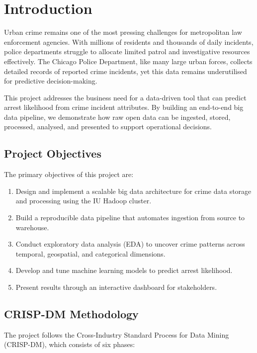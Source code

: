 \section{Introduction}
\label{sec:introduction}

Urban crime remains one of the most pressing challenges for metropolitan law enforcement agencies. With millions of residents and thousands of daily incidents, police departments struggle to allocate limited patrol and investigative resources effectively. The Chicago Police Department, like many large urban forces, collects detailed records of reported crime incidents, yet this data remains underutilised for predictive decision-making.

This project addresses the business need for a data-driven tool that can predict arrest likelihood from crime incident attributes. By building an end-to-end big data pipeline, we demonstrate how raw open data can be ingested, stored, processed, analysed, and presented to support operational decisions.

\subsection{Project Objectives}

The primary objectives of this project are:

\begin{enumerate}
    \item Design and implement a scalable big data architecture for crime data storage and processing using the IU Hadoop cluster.
    \item Build a reproducible data pipeline that automates ingestion from source to warehouse.
    \item Conduct exploratory data analysis (EDA) to uncover crime patterns across temporal, geospatial, and categorical dimensions.
    \item Develop and tune machine learning models to predict arrest likelihood.
    \item Present results through an interactive dashboard for stakeholders.
\end{enumerate}

\subsection{CRISP-DM Methodology}

The project follows the Cross-Industry Standard Process for Data Mining (CRISP-DM), which consists of six phases:

